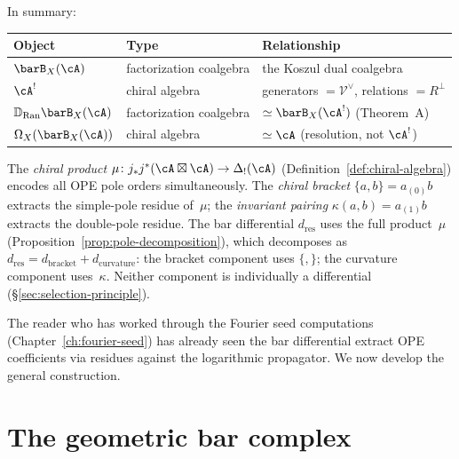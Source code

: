\begin{convention}
\smallskip\noindent
In summary:
\begin{center}
\small
\renewcommand{\arraystretch}{1.15}
\begin{tabular}{lll}
\textbf{Object} & \textbf{Type} & \textbf{Relationship} \\
\hline
$\barB_X(\cA)$ & factorization coalgebra
  & the Koszul dual coalgebra \\[2pt]
$\cA^!$ & chiral algebra
  & generators $= \mathcal{V}^\vee$,
    relations $= R^\perp$ \\[2pt]
$\mathbb{D}_{\operatorname{Ran}}\barB_X(\cA)$
  & factorization coalgebra
  & $\simeq \barB_X(\cA^!)$ (Theorem~A) \\[2pt]
$\Omega_X(\barB_X(\cA))$ & chiral algebra
  & $\simeq \cA$ (resolution, not $\cA^!$)
\end{tabular}
\end{center}
\end{convention}

\begin{convention}
\label{conv:product-vs-bracket}
The \emph{chiral product}
$\mu \colon j_* j^*(\cA \boxtimes \cA) \to \Delta_!(\cA)$
(Definition~\ref{def:chiral-algebra}) encodes all OPE pole
orders simultaneously.  The \emph{chiral bracket}
$\{a,b\} = a_{(0)}b$ extracts the simple-pole residue of~$\mu$;
the \emph{invariant pairing} $\kappa(a,b) = a_{(1)}b$ extracts
the double-pole residue.  The bar differential
$d_{\mathrm{res}}$ uses the full product~$\mu$
(Proposition~\ref{prop:pole-decomposition}), which decomposes as
$d_{\mathrm{res}} = d_{\mathrm{bracket}} + d_{\mathrm{curvature}}$:
the bracket component uses $\{,\}$; the curvature component
uses~$\kappa$.  Neither component is individually a differential
(\S\ref{sec:selection-principle}).
\end{convention}

\label{rem:bar-cobar-hms}%

\begin{remark}\label{rem:bar-cobar-fourier-seed}
The reader who has worked through the Fourier seed computations
(Chapter~\ref{ch:fourier-seed}) has already seen the bar differential
extract OPE coefficients via residues against the logarithmic
propagator.  We now develop the general construction.
\end{remark}

\section{The geometric bar complex}
\label{sec:bar-cobar}

